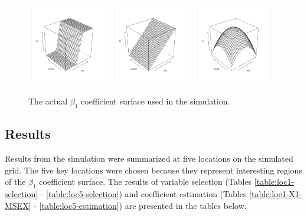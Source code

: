 \documentclass[authoryear, review, 11pt]{elsarticle}
\begin{document}
	\begin{figure}
		\begin{center}
			\includegraphics[width=0.32\textwidth]{../../figures/simulation/step.pdf}
			\includegraphics[width=0.32\textwidth]{../../figures/simulation/gradient.pdf}
			\includegraphics[width=0.32\textwidth]{../../figures/simulation/parabola.pdf}
			\caption{The actual $\beta_1$ coefficient surface used in the simulation.\label{fig:sim-actual}}
		\end{center}
	\end{figure}
	
	\subsection{Results}
	Results from the simulation were summarized at five locations on the simulated grid. The five key locations were chosen because they represent interesting regions of the $\beta_1$ coefficient surface. The results of variable selection (Tables \ref{table:loc1-selection} - \ref{table:loc5-selection}) and coefficient estimation (Tables \ref{table:loc1-X1-MSEX} - \ref{table:loc5-estimation}) are presented in the tables below.
	
\end{document}
